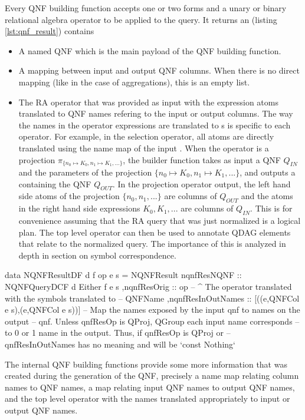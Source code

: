 Every QNF building function accepts one or two  forms and a
unary or binary relational algebra operator to be applied to the query.
It returns an  (listing \ref{lst:qnf_result}) contains

\begin{itemize}
\item A  named QNF which is the main payload of the QNF building function.
\item A mapping between input and output QNF columns. When there is no direct mapping
 (like in the case of aggregations), this is an empty list.
\item The RA operator that was provided as input with the expression atoms
  translated to QNF names
  refering to the input or output columns. The way the names in the operator expressions are translated to
  s is specific to each operator. For example,
  in the selection operator, all atoms are directly translated
  using the name map of the input . When the operator is a
  projection \(\pi_{\{n_0 \mapsto K_0, n_1 \mapsto K_1, ...\}}\), the
  builder function takes as input a QNF \(Q_{IN}\) and the parameters of the projection
  \(\{n_0 \mapsto K_0, n_1 \mapsto K_1, ...\}\), and outputs a  containing the
  QNF \(Q_{OUT}\).
  In the projection operator output, the left hand side atoms of the projection \(\{n_0, n_1, ...\}\) are
  columns of \(Q_{OUT}\) and the atoms in the right hand side expressions \(K_0,K_1,...\) are columns of \(Q_{IN}\).
  This is for convenience assuming that the RA
  query that was just normalized is a logical plan. The top level
  operator can then be used to annotate QDAG elements that relate to
  the normalized query. The importance of this is analyzed in depth in
  section \label{sel:symbol_correspondence} on symbol correspondence.

\end{itemize}

\begin{code}
  \begin{haskellcode}
    data NQNFResultDF d f op e s =
    NQNFResult
    { nqnfResNQNF :: NQNFQueryDCF d Either f e s
      ,nqnfResOrig :: op
      -- ^ The operator translated with the symbols translated to
      -- QNFName
      ,nqnfResInOutNames :: [((e,QNFCol e s),(e,QNFCol e s))]
      -- Map the names exposed by the input qnf to names on the output
      -- qnf. Unless qnfResOp is QProj, QGroup each input name corresponds
      -- to 0 or 1 name in the output. Thus, if qnfResOp is QProj or
      -- qnfResInOutNames has no meaning and will be `const Nothing`
    }
  \end{haskellcode}
  \caption{\label{lst:qnf_result}The internal QNF building functions
    provide some more information that was created during the
    generation of the QNF, precisely a name map relating column names
    to QNF names, a map relating input QNF names to output QNF names,
    and the top level operator with the names translated appropriately
    to input or output QNF names.}
\end{code}

